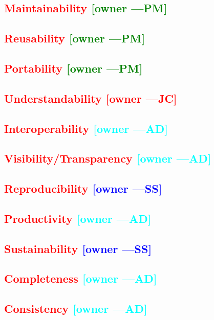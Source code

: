 \documentclass[letterpaper,cleveref]{lipics-v2019}
\newcommand{\authornote}[3]{\textcolor{#1}{[#3 ---#2]}}
\newcommand{\authornote}[3]{}
\newcommand{\wss}[1]{\authornote{blue}{SS}{#1}} %
\newcommand{\jc}[1]{\authornote{red}{JC}{#1}} %
\newcommand{\pmi}[1]{\authornote{green}{PM}{#1}} %
\newcommand{\ad}[1]{\authornote{cyan}{AD}{#1}} %
\newcommand{\notdone}[1]{\textcolor{red}{#1}}
\theoremstyle{definition}
\begin{document}
\subsection{\notdone{Maintainability} \pmi{owner}}

\subsection{\notdone{Reusability} \pmi{owner}}

\subsection{\notdone{Portability} \pmi{owner}}

\subsection{\notdone{Understandability} \jc{owner}}

\subsection{\notdone{Interoperability} \ad{owner}}

\subsection{\notdone{Visibility/Transparency} \ad{owner}}

\subsection{\notdone{Reproducibility} \wss{owner}}

\subsection{\notdone{Productivity} \ad{owner}}

\subsection{\notdone{Sustainability} \wss{owner}}

\subsection{\notdone{Completeness} \ad{owner}}

\subsection{\notdone{Consistency} \ad{owner}}
\end{document}
